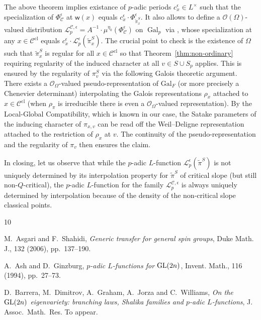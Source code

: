 \documentclass{amsart}
\theoremstyle{definition}
\newcommand{\cL}{\mathcal{L}}
\newcommand{\Gal}{\operatorname{Gal}}
\begin{document}
{ 
 The above theorem implies existance of $p$-adic periods $c_x^{\epsilon}\in L^\times$ such that the  specialization of $\Phi_{\mathcal{C}}^\epsilon$ at $\mathsf{w}(x)$ equals $c_x^{\epsilon}\cdot \Phi_{\tilde\pi_x^S}^\epsilon$. It also allows to define a $\mathcal{O}(\Omega)$-valued distribution 
 $\mathcal{L}_p^{\mathcal{C},\epsilon} = A^{-1}\cdot  \mu^{\eta_0}(\Phi_{\mathcal{C}}^\epsilon)$ on $\Gal_p$ via \cite[Def.~6.17]{BDW}, 
 whose specialization at any  $x\in  \mathcal{C}^{\mathrm{cl}}$ equals $c_x^{\epsilon}\cdot \cL^\epsilon_p(\tilde{\pi}_x^S)$. 
The crucial point to check is the existence of  $\Omega$  such that  $\tilde\pi_x^S$ is  regular  for all $x\in \mathcal{C}^{\mathrm{cl}}$ so that 
Theorem~\ref{thm:non-ordinary} requiring regularity of the induced character at all  $v\in S\cup S_p$ applies. 
This is ensured by the regularity of $\pi_v^S$ via the following Galois theoretic argument. There exists a $\mathcal{O}_\Omega$-valued pseudo-representation of $\mathrm{Gal}_F$ (or more precisely a Chenevier determinant) interpolating the Galois representations $\rho_x$ attached to  $x\in  \mathcal{C}^{\mathrm{cl}}$ (when $\rho_\pi$ is irreducible there is even a $\mathcal{O}_\Omega$-valued representation). 
By the Local-Global Compatibility, which is  known in our case, the Satake parameters of the inducing character of $\pi_{x,v}$ can be read off the Weil--Deligne representation attached to the restriction of $\rho_x$ at $v$. The continuity of the pseudo-representation and the 
 regularity of $\pi_v$ then ensures the claim. 

In closing, let us observe that while the $p$-adic $L$-function   $\cL^\epsilon_p(\tilde{\pi}^S)$ is not uniquely determined by its interpolation property 
  for  $\tilde\pi^S$ of critical slope (but still non-$Q$-critical), the $p$-adic $L$-function for the family  $\mathcal{L}_p^{\mathcal{C},\epsilon}$ is 
  always uniquely determined by  interpolation because of the density of the  non-critical slope classical points. 	


\begin{thebibliography}{10}


{\sc M.~Asgari and F.~Shahidi}, {\em Generic transfer for general spin groups},
  Duke Math. J., 132 (2006), pp.~137--190.

{\sc A.~Ash and D.~Ginzburg}, {\em {$p$}-adic {$L$}-functions for {${\rm
  GL}(2n)$}}, Invent. Math., 116 (1994), pp.~27--73.

{\sc D.~Barrera, M.~Dimitrov, A.~Graham, A.~Jorza and C.~Williams},
  {\em On the ${\rm GL}(2n)$ eigenvariety: branching laws, {S}halika families and
  $p$-adic ${L}$-functions}, J. Assoc.\ Math.\ Res.
\newblock To appear.



\end{thebibliography}}
\end{document}
